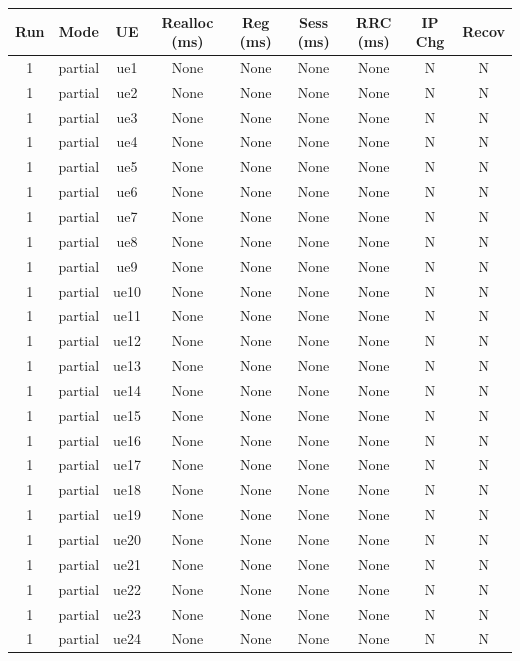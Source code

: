 \begin{table}[ht]
\centering
\begin{tabular}{|c|c|c|c|c|c|c|c|c|}
\hline
Run & Mode & UE & Realloc (ms) & Reg (ms) & Sess (ms) & RRC (ms) & IP Chg & Recov \\
\hline
1 & partial & ue1 & None & None & None & None & N & N \\
1 & partial & ue2 & None & None & None & None & N & N \\
1 & partial & ue3 & None & None & None & None & N & N \\
1 & partial & ue4 & None & None & None & None & N & N \\
1 & partial & ue5 & None & None & None & None & N & N \\
1 & partial & ue6 & None & None & None & None & N & N \\
1 & partial & ue7 & None & None & None & None & N & N \\
1 & partial & ue8 & None & None & None & None & N & N \\
1 & partial & ue9 & None & None & None & None & N & N \\
1 & partial & ue10 & None & None & None & None & N & N \\
1 & partial & ue11 & None & None & None & None & N & N \\
1 & partial & ue12 & None & None & None & None & N & N \\
1 & partial & ue13 & None & None & None & None & N & N \\
1 & partial & ue14 & None & None & None & None & N & N \\
1 & partial & ue15 & None & None & None & None & N & N \\
1 & partial & ue16 & None & None & None & None & N & N \\
1 & partial & ue17 & None & None & None & None & N & N \\
1 & partial & ue18 & None & None & None & None & N & N \\
1 & partial & ue19 & None & None & None & None & N & N \\
1 & partial & ue20 & None & None & None & None & N & N \\
1 & partial & ue21 & None & None & None & None & N & N \\
1 & partial & ue22 & None & None & None & None & N & N \\
1 & partial & ue23 & None & None & None & None & N & N \\
1 & partial & ue24 & None & None & None & None & N & N \\

\end{tabular}
\end{table}
